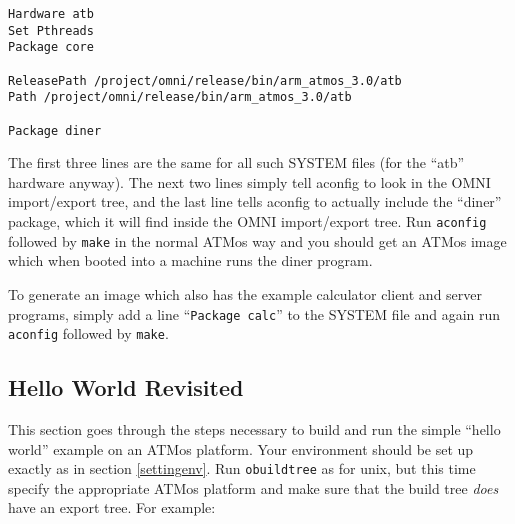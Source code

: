 \documentclass[11pt,twoside,onecolumn]{article}
\begin{document}
{\small \begin{verbatim}
Hardware atb
Set Pthreads
Package core

ReleasePath /project/omni/release/bin/arm_atmos_3.0/atb
Path /project/omni/release/bin/arm_atmos_3.0/atb

Package diner
\end{verbatim}}

The first three lines are the same for all such SYSTEM files (for the ``atb''
hardware anyway).  The next two lines simply tell aconfig to look in the OMNI
import/export tree, and the last line tells aconfig to actually include the
``diner'' package, which it will find inside the OMNI import/export tree.  Run
{\tt aconfig} followed by {\tt make} in the normal ATMos way and you should get
an ATMos image which when booted into a machine runs the diner program.

To generate an image which also has the example calculator client and server
programs, simply add a line ``{\tt Package calc}'' to the SYSTEM file and again
run {\tt aconfig} followed by {\tt make}.

\subsection{Hello World Revisited}
\label{atmoshello}

This section goes through the steps necessary to build and run the simple
``hello world'' example on an ATMos platform.  Your environment should be set
up exactly as in section \ref{settingenv}.  Run {\tt obuildtree} as for unix,
but this time specify the appropriate ATMos platform and make sure that the
build tree {\em does} have an export tree. For example:
\end{document}
